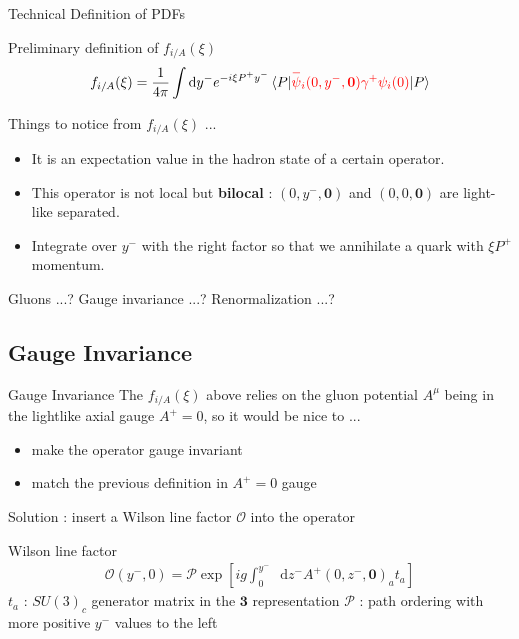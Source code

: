\documentclass[aspectratio=169,xcolor=dvipsnames]{beamer}
\newcommand{\overbar}[1]{
	\mkern 1.5mu \overline{\mkern-1.5mu\raisebox{0pt}[\dimexpr\height+0.5mm\relax]{$#1$}\mkern-1.5mu}\mkern 1.5mu
}
\newcommand*\dif{\mathop{}\!\mathrm{d}}
\begin{document}
\begin{frame}{Technical Definition of PDFs}		
	
	\begin{block}{Preliminary definition of $f_{i/A}(\xi)$}
		\begin{align*}
		f_{i/A}(\xi) = \frac{1}{4\pi} \int \dif y^- e^{-i\xi P^+ y^-} \braket{P|\begingroup \color{red} \overbar{\psi}_i(0,y^-,\mathbf{0})\gamma^+\psi_i(0)\endgroup|P}\\
		\end{align*}
	\end{block}\vskip0.15in
				        
	Things to notice from $f_{i/A}(\xi)$ ... \vskip0.1in
	\begin{itemize}
		\item It is an expectation value in the hadron state of a certain \alert{operator}.
		\item This operator is not local but \textbf{bilocal} : $(0,y^-,\mathbf{0})$ and $(0,0,\mathbf{0})$ are light-like separated.
		\item Integrate over $y^-$ with the right factor so that we annihilate a quark with $\xi P^+$ momentum.
	\end{itemize}

	\MVRightArrow{} Gluons ...? Gauge invariance ...? Renormalization ...?
\end{frame}

\subsection{Gauge Invariance}
\begin{frame}{Gauge Invariance}
	The $f_{i/A}(\xi)$ above relies on the gluon potential $A^\mu$ being in the lightlike axial gauge $A^+=0$, so it would be nice to ...
	\begin{itemize}
		\item make the \alert{operator} gauge invariant
		\item match the previous definition in $A^+=0$ gauge
	\end{itemize}\vskip0.1in
	\MVRightArrow{} Solution : insert a Wilson line factor $\mathcal{O}$ into the operator 
	
	\begin{block}{Wilson line factor}
		\begin{align*}
			\mathcal{O}(y^-,0)=\mathcal{P}\exp \left[ ig \int_{0}^{y^-} \dif z^- A^+(0,z^-,\mathbf{0})_a t_a \right]
		\end{align*}
		\centering
		 $t_a$ : $SU(3)_c$ generator matrix in the $\mathbf{3}$ representation \vskip0.05in
		$\mathcal{P}$ : path ordering with more positive $y^-$ values to the left \vskip0.1in
 	\end{block}
	
\end{frame}
\end{document}
